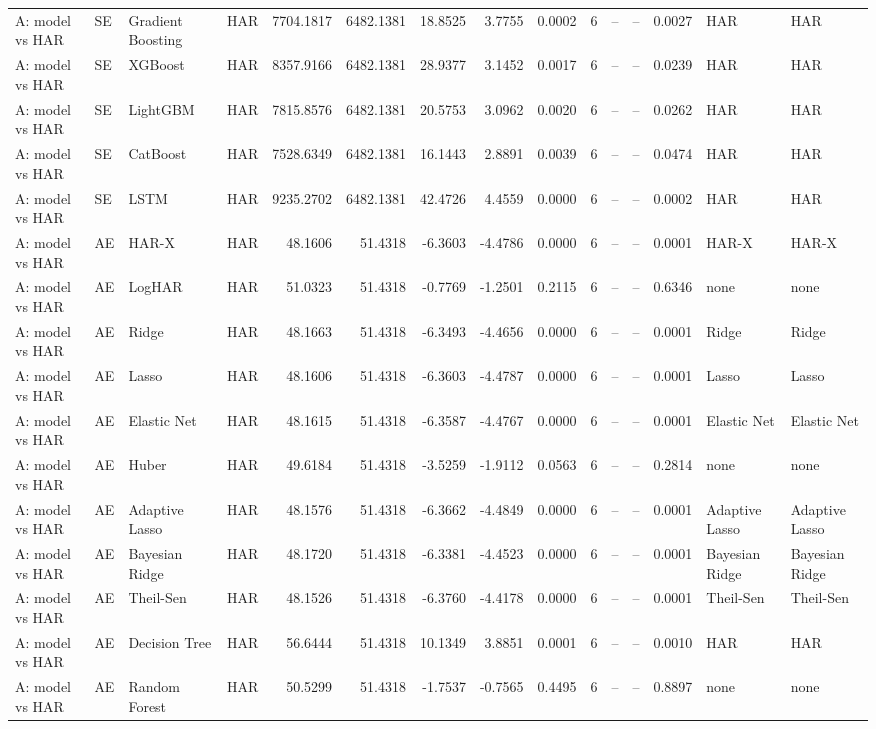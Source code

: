 \begin{table}[htbp]
{\begin{tabular}{llllrrrrrrrrrll}
A: model vs HAR & SE & Gradient Boosting & HAR & 7704.1817 & 6482.1381 & 18.8525 & 3.7755 & 0.0002 & 6 & -- & -- & 0.0027 & HAR & HAR \\
A: model vs HAR & SE & XGBoost & HAR & 8357.9166 & 6482.1381 & 28.9377 & 3.1452 & 0.0017 & 6 & -- & -- & 0.0239 & HAR & HAR \\
A: model vs HAR & SE & LightGBM & HAR & 7815.8576 & 6482.1381 & 20.5753 & 3.0962 & 0.0020 & 6 & -- & -- & 0.0262 & HAR & HAR \\
A: model vs HAR & SE & CatBoost & HAR & 7528.6349 & 6482.1381 & 16.1443 & 2.8891 & 0.0039 & 6 & -- & -- & 0.0474 & HAR & HAR \\
A: model vs HAR & SE & LSTM & HAR & 9235.2702 & 6482.1381 & 42.4726 & 4.4559 & 0.0000 & 6 & -- & -- & 0.0002 & HAR & HAR \\
A: model vs HAR & AE & HAR-X & HAR & 48.1606 & 51.4318 & -6.3603 & -4.4786 & 0.0000 & 6 & -- & -- & 0.0001 & HAR-X & HAR-X \\
A: model vs HAR & AE & LogHAR & HAR & 51.0323 & 51.4318 & -0.7769 & -1.2501 & 0.2115 & 6 & -- & -- & 0.6346 & none & none \\
A: model vs HAR & AE & Ridge & HAR & 48.1663 & 51.4318 & -6.3493 & -4.4656 & 0.0000 & 6 & -- & -- & 0.0001 & Ridge & Ridge \\
A: model vs HAR & AE & Lasso & HAR & 48.1606 & 51.4318 & -6.3603 & -4.4787 & 0.0000 & 6 & -- & -- & 0.0001 & Lasso & Lasso \\
A: model vs HAR & AE & Elastic Net & HAR & 48.1615 & 51.4318 & -6.3587 & -4.4767 & 0.0000 & 6 & -- & -- & 0.0001 & Elastic Net & Elastic Net \\
A: model vs HAR & AE & Huber & HAR & 49.6184 & 51.4318 & -3.5259 & -1.9112 & 0.0563 & 6 & -- & -- & 0.2814 & none & none \\
A: model vs HAR & AE & Adaptive Lasso & HAR & 48.1576 & 51.4318 & -6.3662 & -4.4849 & 0.0000 & 6 & -- & -- & 0.0001 & Adaptive Lasso & Adaptive Lasso \\
A: model vs HAR & AE & Bayesian Ridge & HAR & 48.1720 & 51.4318 & -6.3381 & -4.4523 & 0.0000 & 6 & -- & -- & 0.0001 & Bayesian Ridge & Bayesian Ridge \\
A: model vs HAR & AE & Theil-Sen & HAR & 48.1526 & 51.4318 & -6.3760 & -4.4178 & 0.0000 & 6 & -- & -- & 0.0001 & Theil-Sen & Theil-Sen \\
A: model vs HAR & AE & Decision Tree & HAR & 56.6444 & 51.4318 & 10.1349 & 3.8851 & 0.0001 & 6 & -- & -- & 0.0010 & HAR & HAR \\
A: model vs HAR & AE & Random Forest & HAR & 50.5299 & 51.4318 & -1.7537 & -0.7565 & 0.4495 & 6 & -- & -- & 0.8897 & none & none \\

\end{tabular}}
\end{table}
